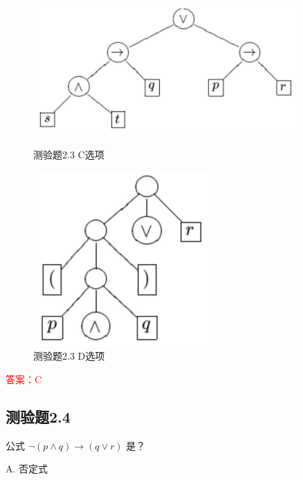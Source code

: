 \documentclass[UTF8, heading=true]{ctexart}
\begin{document}
\clearpage

\begin{figure}[H]
  \centering
  \begin{minipage}[t]{0.45\textwidth}
      \centering
      \includegraphics[width=0.9\textwidth]{2.3_3.jpg} %
      \caption{测验题2.3 C选项}
  \end{minipage}
  \hfill
  \begin{minipage}[t]{0.45\textwidth}
      \centering
      \includegraphics[width=0.6\textwidth]{2.3_4.jpg} %
      \caption{测验题2.3 D选项}
\end{minipage}
\end{figure}

\textcolor{red}{答案：C}



\subsection{测验题2.4}

公式 $\neg(p \wedge q) \rightarrow(q \vee r)$ 是？

A. 否定式
\end{document}

